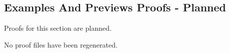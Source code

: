 \subsection*{Examples And Previews Proofs - Planned}

\begin{remark*}
Proofs for this section are planned.
\end{remark*}

\begin{remark*}
No proof files have been regenerated.
\end{remark*}
